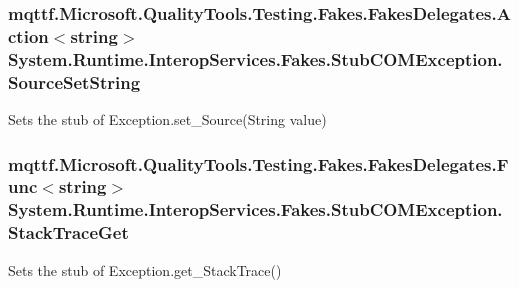 \hypertarget{class_system_1_1_runtime_1_1_interop_services_1_1_fakes_1_1_stub_c_o_m_exception_a0054994c39a0e37bbda5405cb7428129}{
\subsubsection[{Source\-Set\-String}]{\setlength{\rightskip}{0pt plus 5cm}mqttf.\-Microsoft.\-Quality\-Tools.\-Testing.\-Fakes.\-Fakes\-Delegates.\-Action$<$string$>$ System.\-Runtime.\-Interop\-Services.\-Fakes.\-Stub\-C\-O\-M\-Exception.\-Source\-Set\-String}}\label{class_system_1_1_runtime_1_1_interop_services_1_1_fakes_1_1_stub_c_o_m_exception_a0054994c39a0e37bbda5405cb7428129}


Sets the stub of Exception.\-set\-\_\-\-Source(\-String value)

\hypertarget{class_system_1_1_runtime_1_1_interop_services_1_1_fakes_1_1_stub_c_o_m_exception_a83b89d04ccbebf5a53299642ae35afd7}{
\subsubsection[{Stack\-Trace\-Get}]{\setlength{\rightskip}{0pt plus 5cm}mqttf.\-Microsoft.\-Quality\-Tools.\-Testing.\-Fakes.\-Fakes\-Delegates.\-Func$<$string$>$ System.\-Runtime.\-Interop\-Services.\-Fakes.\-Stub\-C\-O\-M\-Exception.\-Stack\-Trace\-Get}}\label{class_system_1_1_runtime_1_1_interop_services_1_1_fakes_1_1_stub_c_o_m_exception_a83b89d04ccbebf5a53299642ae35afd7}


Sets the stub of Exception.\-get\-\_\-\-Stack\-Trace()

